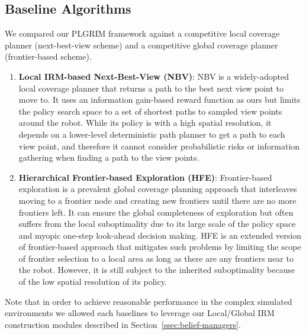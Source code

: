 \documentclass[letterpaper]{article} %
\begin{document}
\subsection{Baseline Algorithms}
We compared our PLGRIM framework against a competitive local coverage planner (next-best-view scheme) and a competitive global coverage planner (frontier-based scheme). 
\vspace{-4pt}
\begin{enumerate}[label={\arabic*)}]
  \itemsep0em 
  \setlength{\itemsep}{0pt}
  \setlength{\parskip}{0pt}
  \item \textbf{Local IRM-based Next-Best-View (NBV)}:
  NBV is a widely-adopted local coverage planner that returns a path to the best next view point to move to.
	It uses an information gain-based reward function as ours but limits the policy search space to a set of shortest paths to sampled view points around the robot.
  While its policy is with a high spatial resolution, it depends on a lower-level deterministic path planner to get a path to each view point, and therefore it cannot consider probabilistic risks or information gathering when finding a path to the view points.
  \item \textbf{Hierarchical Frontier-based Exploration (HFE)}:
	Frontier-based exploration is a prevalent global coverage planning approach that interleaves moving to a frontier node and creating new frontiers until there are no more frontiers left.
	It can ensure the global completeness of exploration but often suffers from the local suboptimality due to its large scale of the policy space and myopic one-step look-ahead decision making.
	HFE is an extended version of frontier-based approach that mitigates such problems by limiting the scope of frontier selection to a local area as long as there are any frontiers near to the robot.
	However, it is still subject to the inherited suboptimality because of the low spatial resolution of its policy.
\end{enumerate}
\vspace{-4pt}
Note that in order to achieve reasonable performance in the complex simulated environments we allowed each baselines to leverage our Local/Global IRM construction modules described in Section~\ref{ssec:belief-managers}.
\end{document}
